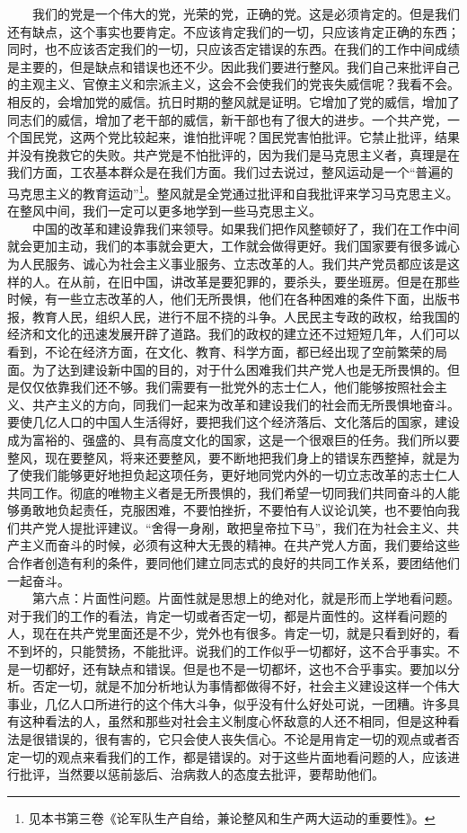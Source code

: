 \documentclass[cn,11pt,chinese]{elegantbook}
\begin{document}
　　我们的党是一个伟大的党，光荣的党，正确的党。这是必须肯定的。但是我们还有缺点，这个事实也要肯定。不应该肯定我们的一切，只应该肯定正确的东西；同时，也不应该否定我们的一切，只应该否定错误的东西。在我们的工作中间成绩是主要的，但是缺点和错误也还不少。因此我们要进行整风。我们自己来批评自己的主观主义、官僚主义和宗派主义，这会不会使我们的党丧失威信呢？我看不会。相反的，会增加党的威信。抗日时期的整风就是证明。它增加了党的威信，增加了同志们的威信，增加了老干部的威信，新干部也有了很大的进步。一个共产党，一个国民党，这两个党比较起来，谁怕批评呢？国民党害怕批评。它禁止批评，结果并没有挽救它的失败。共产党是不怕批评的，因为我们是马克思主义者，真理是在我们方面，工农基本群众是在我们方面。我们过去说过，整风运动是一个“普遍的马克思主义的教育运动”\footnote[1]{见本书第三卷《论军队生产自给，兼论整风和生产两大运动的重要性》。}。整风就是全党通过批评和自我批评来学习马克思主义。在整风中间，我们一定可以更多地学到一些马克思主义。\\
　　中国的改革和建设靠我们来领导。如果我们把作风整顿好了，我们在工作中间就会更加主动，我们的本事就会更大，工作就会做得更好。我们国家要有很多诚心为人民服务、诚心为社会主义事业服务、立志改革的人。我们共产党员都应该是这样的人。在从前，在旧中国，讲改革是要犯罪的，要杀头，要坐班房。但是在那些时候，有一些立志改革的人，他们无所畏惧，他们在各种困难的条件下面，出版书报，教育人民，组织人民，进行不屈不挠的斗争。人民民主专政的政权，给我国的经济和文化的迅速发展开辟了道路。我们的政权的建立还不过短短几年，人们可以看到，不论在经济方面，在文化、教育、科学方面，都已经出现了空前繁荣的局面。为了达到建设新中国的目的，对于什么困难我们共产党人也是无所畏惧的。但是仅仅依靠我们还不够。我们需要有一批党外的志士仁人，他们能够按照社会主义、共产主义的方向，同我们一起来为改革和建设我们的社会而无所畏惧地奋斗。要使几亿人口的中国人生活得好，要把我们这个经济落后、文化落后的国家，建设成为富裕的、强盛的、具有高度文化的国家，这是一个很艰巨的任务。我们所以要整风，现在要整风，将来还要整风，要不断地把我们身上的错误东西整掉，就是为了使我们能够更好地担负起这项任务，更好地同党内外的一切立志改革的志士仁人共同工作。彻底的唯物主义者是无所畏惧的，我们希望一切同我们共同奋斗的人能够勇敢地负起责任，克服困难，不要怕挫折，不要怕有人议论讥笑，也不要怕向我们共产党人提批评建议。“舍得一身剐，敢把皇帝拉下马”，我们在为社会主义、共产主义而奋斗的时候，必须有这种大无畏的精神。在共产党人方面，我们要给这些合作者创造有利的条件，要同他们建立同志式的良好的共同工作关系，要团结他们一起奋斗。\\
　　第六点：片面性问题。片面性就是思想上的绝对化，就是形而上学地看问题。对于我们的工作的看法，肯定一切或者否定一切，都是片面性的。这样看问题的人，现在在共产党里面还是不少，党外也有很多。肯定一切，就是只看到好的，看不到坏的，只能赞扬，不能批评。说我们的工作似乎一切都好，这不合乎事实。不是一切都好，还有缺点和错误。但是也不是一切都坏，这也不合乎事实。要加以分析。否定一切，就是不加分析地认为事情都做得不好，社会主义建设这样一个伟大事业，几亿人口所进行的这个伟大斗争，似乎没有什么好处可说，一团糟。许多具有这种看法的人，虽然和那些对社会主义制度心怀敌意的人还不相同，但是这种看法是很错误的，很有害的，它只会使人丧失信心。不论是用肯定一切的观点或者否定一切的观点来看我们的工作，都是错误的。对于这些片面地看问题的人，应该进行批评，当然要以惩前毖后、治病救人的态度去批评，要帮助他们。\\
\end{document}
